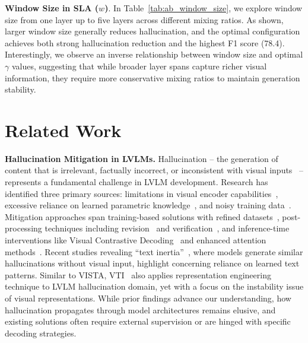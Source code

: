 \documentclass{article}
\theoremstyle{plain}
\theoremstyle{definition}
\theoremstyle{remark}
\begin{document}
\textbf{Window Size in SLA ($w$)}. In Table~\ref{tab:ab_window_size}, we explore window size from one layer up to five layers across different mixing ratios. As shown, larger window size generally reduces hallucination, and the optimal configuration achieves both strong hallucination reduction and the highest F1 score (78.4). Interestingly, we observe an inverse relationship between window size and optimal $\gamma$ values, suggesting that while broader layer spans capture richer visual information, they require more conservative mixing ratios to maintain generation stability.

\section{Related Work}
\label{sec:related_work}

\textbf{Hallucination Mitigation in LVLMs.} 
Hallucination -- the generation of content that is irrelevant, factually incorrect, or inconsistent with visual inputs~\cite{bai2024hallucination} -- represents a fundamental challenge in LVLM development. Research has identified three primary sources: limitations in visual encoder capabilities~\cite{tong2024eyes, liu2024llavanext, shi2024eagle}, excessive reliance on learned parametric knowledge~\cite{li-etal-2023-evaluating, zhou2023analyzing, vcd, opera}, and noisy training data~\cite{liu2023mitigating, yu2024hallucidoctor}. Mitigation approaches span training-based solutions with refined datasets~\cite{yue2024less, jiang2024hallucination}, post-processing techniques including revision~\cite{yin2023woodpecker, zhou2023analyzing} and verification~\cite{chen2024halc, sun2023aligning}, and inference-time interventions like Visual Contrastive Decoding~\cite{vcd} and enhanced attention methods~\cite{pai}. Recent studies revealing ``text inertia''~\cite{pai}, where models generate similar hallucinations without visual input, highlight concerning reliance on learned text patterns. Similar to VISTA, VTI~\cite{liu2024reducing} also applies representation engineering technique to LVLM hallucination domain, yet with a focus on the instability issue of visual representations. While prior findings advance our understanding, how hallucination propagates through model architectures remains elusive, and existing solutions often require external supervision or are hinged with specific decoding strategies.
\end{document}
